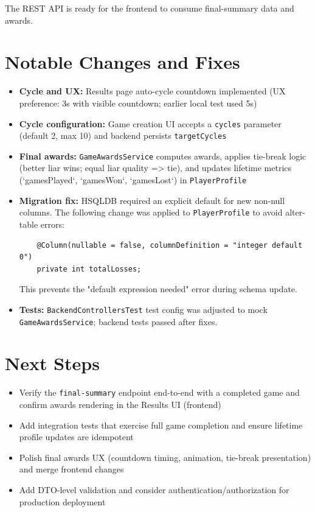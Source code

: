 \documentclass[11pt,a4paper]{article}
\begin{document}
The REST API is ready for the frontend to consume final-summary data and awards.

\section{Notable Changes and Fixes}

\begin{itemize}
    \item \textbf{Cycle and UX:} Results page auto-cycle countdown implemented (UX preference: 3s with visible countdown; earlier local test used 5s)
    \item \textbf{Cycle configuration:} Game creation UI accepts a \texttt{cycles} parameter (default 2, max 10) and backend persists \texttt{targetCycles}
    \item \textbf{Final awards:} \texttt{GameAwardsService} computes awards, applies tie-break logic (better liar wins; equal liar quality => tie), and updates lifetime metrics (`gamesPlayed`, `gamesWon`, `gamesLost`) in \texttt{PlayerProfile}
    \item \textbf{Migration fix:} HSQLDB required an explicit default for new non-null columns. The following change was applied to \texttt{PlayerProfile} to avoid alter-table errors:
    \begin{verbatim}
    @Column(nullable = false, columnDefinition = "integer default 0")
    private int totalLosses;
    \end{verbatim}
    This prevents the "default expression needed" error during schema update.
    \item \textbf{Tests:} \texttt{BackendControllersTest} test config was adjusted to mock \texttt{GameAwardsService}; backend tests passed after fixes.
\end{itemize}

\section{Next Steps}

\begin{itemize}
    \item Verify the \texttt{final-summary} endpoint end-to-end with a completed game and confirm awards rendering in the Results UI (frontend)
    \item Add integration tests that exercise full game completion and ensure lifetime profile updates are idempotent
    \item Polish final awards UX (countdown timing, animation, tie-break presentation) and merge frontend changes
    \item Add DTO-level validation and consider authentication/authorization for production deployment
\end{itemize}
\end{document}
